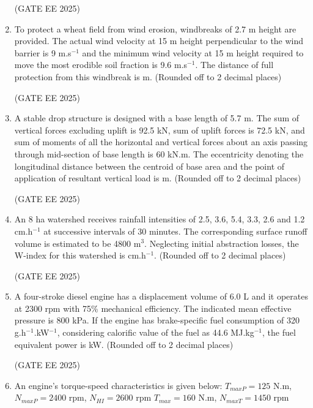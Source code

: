 \documentclass[journal,12pt,onecolumn]{IEEEtran}
\theoremstyle{remark}
\begin{document}
\begin{enumerate}
\hfill(GATE EE 2025)

\item To protect a wheat field from wind erosion, windbreaks of 2.7 m height are provided. The actual wind velocity at 15 m height perpendicular to the wind barrier is 9 m.s$^{-1}$ and the minimum wind velocity at 15 m height required to move the most erodible soil fraction is 9.6 m.s$^{-1}$. The distance of full protection from this windbreak is\underline{\hspace{2cm}} m. (Rounded off to 2 decimal places)

\hfill(GATE EE 2025)

\item A stable drop structure is designed with a base length of 5.7 m. The sum of vertical forces excluding uplift is 92.5 kN, sum of uplift forces is 72.5 kN, and sum of moments of all the horizontal and vertical forces about an axis passing through mid-section of base length is 60 kN.m. The eccentricity denoting the longitudinal distance between the centroid of base area and the point of application of resultant vertical load is\underline{\hspace{2cm}} m. (Rounded off to 2 decimal places)

\hfill(GATE EE 2025)

\item An 8 ha watershed receives rainfall intensities of 2.5, 3.6, 5.4, 3.3, 2.6 and 1.2 cm.h$^{-1}$ at successive intervals of 30 minutes. The corresponding surface runoff volume is estimated to be 4800 m$^3$. Neglecting initial abstraction losses, the W-index for this watershed is \underline{\hspace{2cm}} cm.h$^{-1}$. (Rounded off to 2 decimal places)

\hfill(GATE EE 2025)

\item A four-stroke diesel engine has a displacement volume of 6.0 L and it operates at 2300 rpm with 75\% mechanical efficiency. The indicated mean effective pressure is 800 kPa. If the engine has brake-specific fuel consumption of 320 g.h$^{-1}$.kW$^{-1}$, considering calorific value of the fuel as 44.6 MJ.kg$^{-1}$, the fuel equivalent power is \underline{\hspace{2cm}} kW. (Rounded off to 2 decimal places)

\hfill(GATE EE 2025)

\item An engine's torque-speed characteristics is given below:  
$T_{maxP} = 125$ N.m, $N_{maxP} = 2400$ rpm, $N_{HI} = 2600$ rpm  
$T_{max} = 160$ N.m, $N_{maxT} = 1450$ rpm  


\end{enumerate}
\end{document}
